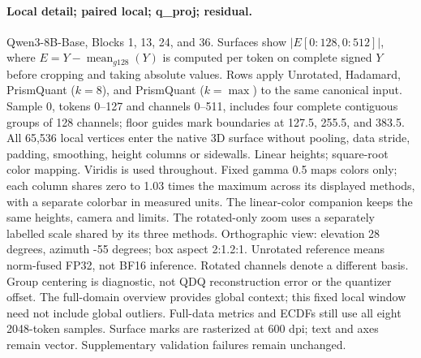 \paragraph{Local detail; paired local; q\_proj; residual.} Qwen3-8B-Base, Blocks 1, 13, 24, and 36. Surfaces show $|E[0:128,0:512]|$, where $E=Y-\operatorname{mean}_{g128}(Y)$ is computed per token on complete signed $Y$ before cropping and taking absolute values. Rows apply Unrotated, Hadamard, PrismQuant ($k=8$), and PrismQuant ($k=\max$) to the same canonical input. Sample 0, tokens 0--127 and channels 0--511, includes four complete contiguous groups of 128 channels; floor guides mark boundaries at 127.5, 255.5, and 383.5. All 65,536 local vertices enter the native 3D surface without pooling, data stride, padding, smoothing, height columns or sidewalls. Linear heights; square-root color mapping. Viridis is used throughout. Fixed gamma 0.5 maps colors only; each column shares zero to 1.03 times the maximum across its displayed methods, with a separate colorbar in measured units. The linear-color companion keeps the same heights, camera and limits. The rotated-only zoom uses a separately labelled scale shared by its three methods. Orthographic view: elevation 28 degrees, azimuth -55 degrees; box aspect 2:1.2:1. Unrotated reference means norm-fused FP32, not BF16 inference. Rotated channels denote a different basis. Group centering is diagnostic, not QDQ reconstruction error or the quantizer offset. The full-domain overview provides global context; this fixed local window need not include global outliers. Full-data metrics and ECDFs still use all eight 2048-token samples. Surface marks are rasterized at 600 dpi; text and axes remain vector. Supplementary validation failures remain unchanged.

